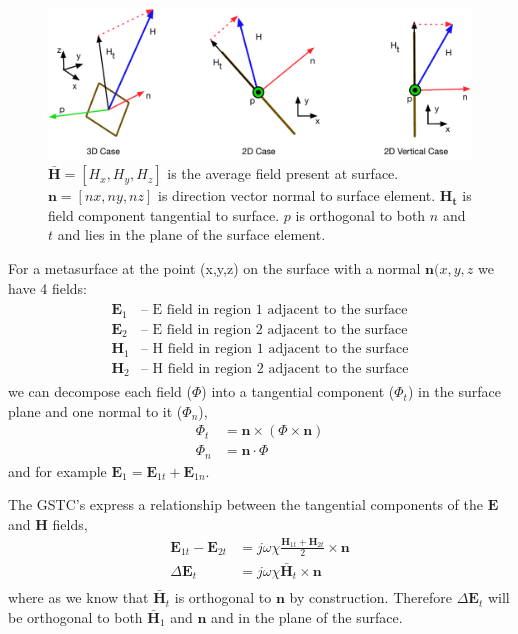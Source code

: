 \documentclass{article}
\newcommand{\E}{\mathbf{E}}
\renewcommand{\H}{\mathbf{H}}
\newcommand{\Hb}{\mathbf{\bar H}}
\newcommand{\n}{\mathbf{n}}
\newcommand{\Ht}{\mathbf{H_t}}
\newcommand{\DE}{\Delta \E}
\renewcommand{\H}{\mathbf{H}}
\newcommand{\0}{\varnothing}
\begin{document}
\begin{figure}[htbp]
\begin{center}
\includegraphics[width=1\columnwidth]{figures/SurfGeo}
\caption{$\Hb = [H_x,H_y,H_z]$ is the average field present at surface. $\n = [nx,ny,nz]$ is direction vector normal to surface element. $\Ht$ is field component tangential to surface. $p$ is orthogonal to both $n$ and $t$ and lies in the plane of the surface element.}\label{Fig:Surface Geo}
\end{center}
\end{figure}


For a metasurface at the point (x,y,z) on the surface with a normal $\n(x,y,z$ we have 4 fields:
\begin{align*}
\begin{array}{cc}
    \E_1 & \text{-- E field in region 1 adjacent to the surface}\\
    \E_2 & \text{-- E field in region 2 adjacent to the surface}\\
    \H_1 & \text{-- H field in region 1 adjacent to the surface}\\
    \H_2 & \text{-- H field in region 2 adjacent to the surface}
\end{array}
\end{align*}
we can decompose each field ($\Phi$) into a tangential component ($\Phi_t$) in the surface plane and one normal to it ($\Phi_n$),
\begin{align*}
\Phi_t &= \n \times (\Phi \times \n) \\
\Phi_n &= \n \cdot \Phi
\end{align*}
and for example $\E_1 = \E_{1t} + \E_{1n}$.

The GSTC's express a relationship between the tangential components of the $\E$ and $\H$ fields,
\begin{align*}
    \E_{1t} - \E_{2t}  &= j \omega \chi \frac{\H_{1t} + \H_{2t}}{2} \times \n\\
    \DE_{t}  &= j \omega \chi  \Hb_t \times \n\\
\end{align*}
where as we know that $\Hb_t$ is orthogonal to $\n$ by construction. Therefore $\DE_{t}$ will be orthogonal to both $\Hb_1$ and $\n$ and in the plane of the surface. 
\end{document}
